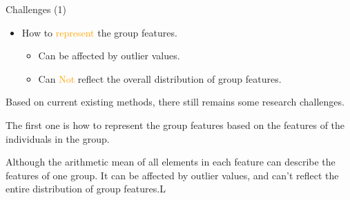 \documentclass[
 size=14pt,
 paper=smartboard,  %
 mode=present, 		%
 display=slides, 	%
 style=tuliplab,  	%
 pauseslide,
 fleqn,leqno]{powerdot}
\begin{document}
\begin{slide}{Challenges (1)}
\begin{itemize}
\item
How to \textcolor{orange}{represent} the group features.

\begin{itemize}
\item
Can be affected by outlier values.

\item
Can \textcolor{orange}{Not} reflect the overall distribution of group features.
\end{itemize}
\end{itemize}

\begin{note}
Based on current existing methods,
there still remains some research challenges.

The first one is how to represent the group features
based on the features of the individuals in the group.

Although the arithmetic mean of all elements
in each feature can describe the features of one group.
It can be affected by outlier values,
and can't reflect the entire distribution of group features.L
\end{note}

\end{slide}
\end{document}
